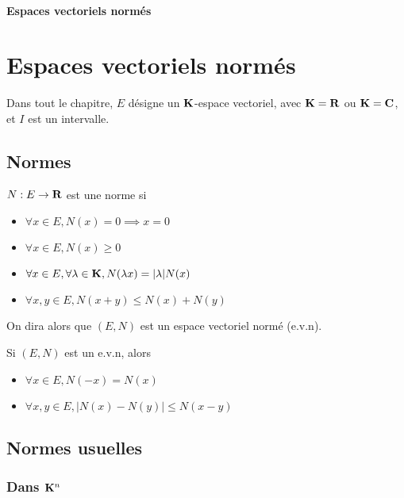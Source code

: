 \ifsolo
    ~

    \vspace{1cm}

    \begin{center}
        \textbf{\LARGE Espaces vectoriels normés} \\[1em]
    \end{center}
    \tableofcontents
\else
    \chapter{Espaces vectoriels normés}

    \minitoc
\fi
\thispagestyle{empty}

Dans tout le chapitre, $E$ désigne un $\mathbf K$-espace vectoriel, avec $\mathbf K=\mathbf R$ ou $\mathbf K=\mathbf C$, et $I$ est un intervalle.
\section{Normes}

\begin{dfn}
    $N:E \to \mathbf R$ est une norme si \begin{itemize}
        \item $\forall  x \in  E, N(x)=0 \implies  x = 0$
        \item $\forall  x \in  E, N(x)\geq 0$
        \item $\forall  x \in  E, \forall  \lambda \in  \mathbf K, N(\lambda x)= |\lambda| N(x)$
        \item $\forall  x,y \in  E, N(x+y)\leq N(x)+N(y)$
    \end{itemize}
    On dira alors que $(E, N)$ est un espace vectoriel normé (e.v.n).  
\end{dfn}

\begin{rem}
    Si $(E, N)$ est un e.v.n, alors \begin{itemize}
        \item $\forall  x \in  E, N(-x)=N(x)$
        \item $\forall  x, y \in  E, |N(x)-N(y)|\leq N(x-y)$
    \end{itemize}
\end{rem}


\section{Normes usuelles}

\subsection{Dans \texorpdfstring{$\mathbf K^n$}{K\^{}n}}


